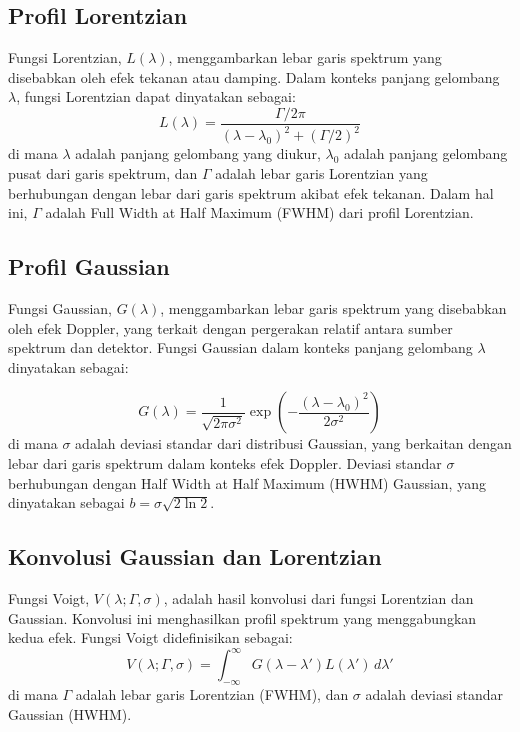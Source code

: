 \subsection{Profil Lorentzian}
\par Fungsi Lorentzian, \( L(\lambda) \), menggambarkan lebar garis spektrum yang disebabkan oleh efek tekanan atau damping. Dalam konteks panjang gelombang \( \lambda \), fungsi Lorentzian dapat dinyatakan sebagai:
\begin{equation}
L(\lambda) = \frac{\Gamma / 2\pi}{(\lambda - \lambda_0)^2 + (\Gamma / 2)^2}
\end{equation}
di mana \( \lambda \) adalah panjang gelombang yang diukur, \( \lambda_0 \) adalah panjang gelombang pusat dari garis spektrum, dan \( \Gamma \) adalah lebar garis Lorentzian yang berhubungan dengan lebar dari garis spektrum akibat efek tekanan. Dalam hal ini, \( \Gamma \) adalah Full Width at Half Maximum (FWHM) dari profil Lorentzian.

\subsection{Profil Gaussian}
\par Fungsi Gaussian, \( G(\lambda) \), menggambarkan lebar garis spektrum yang disebabkan oleh efek Doppler, yang terkait dengan pergerakan relatif antara sumber spektrum dan detektor. Fungsi Gaussian dalam konteks panjang gelombang \( \lambda \) dinyatakan sebagai:

\begin{equation}
G(\lambda) = \frac{1}{\sqrt{2\pi \sigma^2}} \exp\left(-\frac{(\lambda - \lambda_0)^2}{2\sigma^2}\right)
\end{equation}
di mana \( \sigma \) adalah deviasi standar dari distribusi Gaussian, yang berkaitan dengan lebar dari garis spektrum dalam konteks efek Doppler. Deviasi standar \( \sigma \) berhubungan dengan Half Width at Half Maximum (HWHM) Gaussian, yang dinyatakan sebagai \( b = \sigma \sqrt{2 \ln 2} \).

\subsection{Konvolusi Gaussian dan Lorentzian}
\par Fungsi Voigt, \( V(\lambda; \Gamma, \sigma) \), adalah hasil konvolusi dari fungsi Lorentzian dan Gaussian. Konvolusi ini menghasilkan profil spektrum yang menggabungkan kedua efek. Fungsi Voigt didefinisikan sebagai:
\begin{equation}
V(\lambda; \Gamma, \sigma) = \int_{-\infty}^{\infty} G(\lambda - \lambda') L(\lambda') \, d\lambda'
\end{equation}
di mana \( \Gamma \) adalah lebar garis Lorentzian (FWHM), dan \( \sigma \) adalah deviasi standar Gaussian (HWHM).

